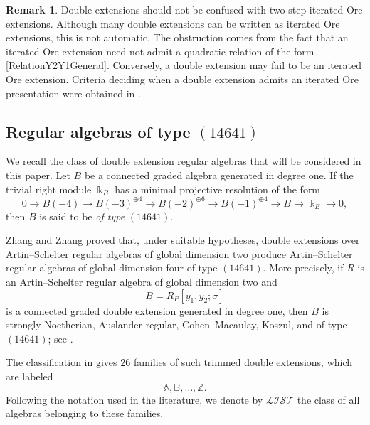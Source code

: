 \documentclass{amsart}
\theoremstyle{definition}
\newtheorem{remark}[theorem]{Remark}
\theoremstyle{remark}
\numberwithin{equation}{section}
\begin{document}
\begin{remark}\label{RemarkDoubleVsIteratedOre}
Double extensions should not be confused with two-step iterated Ore extensions. Although many double extensions can be written as iterated Ore extensions, this is not automatic. The obstruction comes from the fact that an iterated Ore extension need not admit a quadratic relation of the form \eqref{RelationY2Y1General}. Conversely, a double extension may fail to be an iterated Ore extension. Criteria deciding when a double extension admits an iterated Ore presentation were obtained in \cite{Carvalhoetal2011}.
\end{remark}

\subsection{Regular algebras of type \texorpdfstring{$(14641)$}{(14641)}}\label{SubsectionType14641}

We recall the class of double extension regular algebras that will be considered in this paper. Let $B$ be a connected graded algebra generated in degree one. If the trivial right module $\Bbbk_B$ has a minimal projective resolution of the form
\begin{equation}\label{Resolution14641}
0
\longrightarrow B(-4)
\longrightarrow B(-3)^{\oplus 4}
\longrightarrow B(-2)^{\oplus 6}
\longrightarrow B(-1)^{\oplus 4}
\longrightarrow B
\longrightarrow \Bbbk_B
\longrightarrow 0,
\end{equation}
then $B$ is said to be \emph{of type} $(14641)$.

Zhang and Zhang \cite{ZhangZhang2009} proved that, under suitable hypotheses, double extensions over Artin--Schelter regular algebras of global dimension two produce Artin--Schelter regular algebras of global dimension four of type $(14641)$. More precisely, if $R$ is an Artin--Schelter regular algebra of global dimension two and
\[
B=R_P[y_1,y_2;\sigma]
\]
is a connected graded double extension generated in degree one, then $B$ is strongly Noetherian, Auslander regular, Cohen--Macaulay, Koszul, and of type $(14641)$; see \cite[Theorem 0.1]{ZhangZhang2009}.

The classification in \cite{ZhangZhang2009} gives $26$ families of such trimmed double extensions, which are labeled
\[
\mathbb{A},\mathbb{B},\dots,\mathbb{Z}.
\]
Following the notation used in the literature, we denote by $\mathcal{LIST}$ the class of all algebras belonging to these families.
\end{document}
